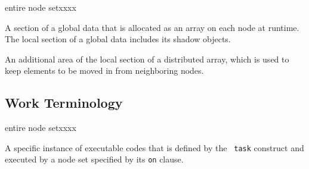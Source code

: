 \begin{namelist}{entire node setxxxx}

 A section of a global data that is allocated as an array on each node
 at runtime.
%
 The local section of a global data includes its shadow objects.


 An additional area of the local section of a distributed array, which
 is used to keep elements to be moved in from neighboring
 nodes.


\end{namelist}


\subsection{Work Terminology}

\begin{namelist}{entire node setxxxx}


 A specific instance of executable codes that is defined by the {\tt
 task} construct and executed by a node set specified by its {\tt on}
 clause.


%

%


\end{namelist}


